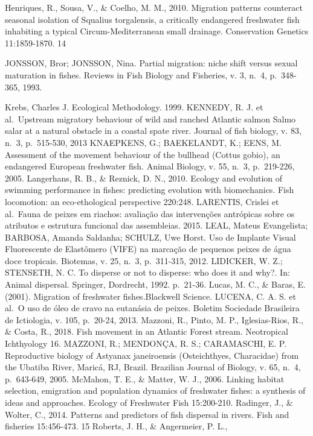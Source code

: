 \documentclass[
]{article}
\begin{document}
Henriques, R., Sousa, V., \& Coelho, M. M., 2010. Migration patterns
counteract seasonal isolation of Squalius torgalensis, a critically
endangered freshwater fish inhabiting a typical Circum-Mediterranean
small drainage. Conservation Genetics 11:1859-1870. 14

JONSSON, Bror; JONSSON, Nina. Partial migration: niche shift versus
sexual maturation in fishes. Reviews in Fish Biology and Fisheries, v.
3, n.~4, p.~348-365, 1993.

Krebs, Charles J. Ecological Methodology. 1999. KENNEDY, R. J. et
al.~Upstream migratory behaviour of wild and ranched Atlantic salmon
Salmo salar at a natural obstacle in a coastal spate river. Journal of
fish biology, v. 83, n.~3, p.~515-530, 2013 KNAEPKENS, G.; BAEKELANDT,
K.; EENS, M. Assessment of the movement behaviour of the bullhead
(Cottus gobio), an endangered European freshwater fish. Animal Biology,
v. 55, n.~3, p.~219-226, 2005. Langerhans, R. B., \& Reznick, D. N.,
2010. Ecology and evolution of swimming performance in fishes:
predicting evolution with biomechanics. Fish locomotion: an
eco-ethological perspective 220:248. LARENTIS, Crislei et al.~Fauna de
peixes em riachos: avaliação das intervenções antrópicas sobre os
atributos e estrutura funcional das assembleias. 2015. LEAL, Mateus
Evangelista; BARBOSA, Amanda Saldanha; SCHULZ, Uwe Horst. Uso de
Implante Visual Fluorescente de Elastômero (VIFE) na marcação de
pequenos peixes de água doce tropicais. Biotemas, v. 25, n.~3,
p.~311-315, 2012. LIDICKER, W. Z.; STENSETH, N. C. To disperse or not to
disperse: who does it and why?. In: Animal dispersal. Springer,
Dordrecht, 1992. p.~21-36. Lucas, M. C., \& Baras, E. (2001). Migration
of freshwater fishes.Blackwell Science. LUCENA, C. A. S. et al.~O uso de
óleo de cravo na eutanásia de peixes. Boletim Sociedade Brasileira de
Ictiologia, v. 105, p.~20-24, 2013. Mazzoni, R., Pinto, M. P.,
Iglesias-Rios, R., \& Costa, R., 2018. Fish movement in an Atlantic
Forest stream. Neotropical Ichthyology 16. MAZZONI, R.; MENDONÇA, R. S.;
CARAMASCHI, E. P. Reproductive biology of Astyanax janeiroensis
(Osteichthyes, Characidae) from the Ubatiba River, Maricá, RJ, Brazil.
Brazilian Journal of Biology, v. 65, n.~4, p.~643-649, 2005. McMahon, T.
E., \& Matter, W. J., 2006. Linking habitat selection, emigration and
population dynamics of freshwater fishes: a synthesis of ideas and
approaches. Ecology of Freshwater Fish 15:200-210. Radinger, J., \&
Wolter, C., 2014. Patterns and predictors of fish dispersal in rivers.
Fish and fisheries 15:456-473. 15 Roberts, J. H., \& Angermeier, P. L.,
\end{document}
